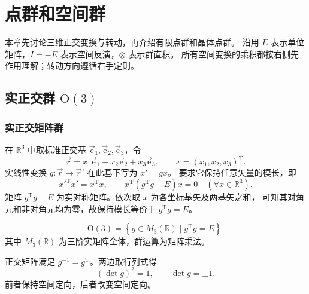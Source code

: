 \chapter{点群和空间群}

本章先讨论三维正交变换与转动，再介绍有限点群和晶体点群。
沿用 $E$ 表示单位矩阵，$I=-E$ 表示空间反演，$\otimes$ 表示群直积。
所有空间变换的乘积都按右侧先作用理解；转动方向遵循右手定则。

\section{\texorpdfstring{实正交群 $\mathrm{O}\left(3\right)$}{实正交群 O(3)}}
\subsection{实正交矩阵群}
在 $\mathbb{R}^3$ 中取标准正交基 $\vec{\mathrm{e}}_1,\vec{\mathrm{e}}_2,\vec{\mathrm{e}}_3$，令
\begin{equation}
\vec r=x_1\vec{\mathrm{e}}_1+x_2\vec{\mathrm{e}}_2+x_3\vec{\mathrm{e}}_3,
\qquad x=\left(x_1,x_2,x_3\right)^{\mathrm{T}}.
\end{equation}
实线性变换 $g:\vec r\mapsto\vec r'$ 在此基下写为 $x'=gx$。
要求它保持任意矢量的模长，即
\begin{equation}
x'^{\mathrm{T}}x'=x^{\mathrm{T}}x,
\qquad x^{\mathrm{T}}\left(g^{\mathrm{T}}g-E\right)x=0\quad\left(\forall x\in\mathbb{R}^3\right).
\end{equation}
矩阵 $g^{\mathrm{T}}g-E$ 为实对称矩阵。依次取 $x$ 为各坐标基矢及两基矢之和，
可知其对角元和非对角元均为零，故保持模长等价于 $g^{\mathrm{T}}g=E$。

\begin{definition}[实正交矩阵群]
\begin{equation}
\mathrm{O}\left(3\right)=\left\{g\in M_3\left(\mathbb{R}\right)\mid g^{\mathrm{T}}g=E\right\}.
\end{equation}
其中 $M_3\left(\mathbb{R}\right)$ 为三阶实矩阵全体，群运算为矩阵乘法。
\end{definition}
正交矩阵满足 $g^{-1}=g^{\mathrm{T}}$。两边取行列式得
\begin{equation}
\left(\det g\right)^2=1,\qquad\det g=\pm1.
\end{equation}
前者保持空间定向，后者改变空间定向。

